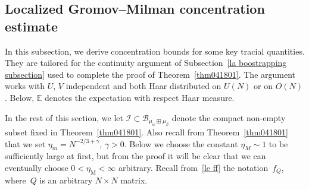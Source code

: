 \documentclass[10pt,reqno]{amsart}
\numberwithin{equation}{section}
\theoremstyle{plain}
\numberwithin{kevin}{section}
\theoremstyle{remark}
\begin{document}
\subsection{Localized Gromov--Milman concentration estimate}\label{la concentration for the random part}
 In this subsection, we derive concentration bounds for some key tracial quantities. They are tailored for the continuity argument of Subsection~\ref{la boostrapping subsection} used to complete the proof of Theorem~\ref{thm041801}. The argument works with $U$, $V$ independent and both Haar distributed on $U(N)$ or on $O(N)$. Below, $\mathbb{E}$ denotes the expectation with respect Haar measure.

 In the rest of this section, we let $\mathcal{I}\subset\mathcal{B}_{\mu_\alpha\boxplus\mu_\beta}$ denote the compact non-empty subset fixed in Theorem~\ref{thm041801}. Also recall from Theorem~\ref{thm041801} that we set $\eta_m=N^{-2/3+\gamma}$, $\gamma>0$. Below we choose the constant $\eta_M\sim 1$ to be sufficiently large at first, but from the proof it will be clear that we can eventually choose $0<\eta_{\mathrm{M}}<\infty$ arbitrary. Recall from~\eqref{le ff} the notation~$f_Q$, where~$Q$ is an arbitrary $N\times N$ matrix.
 
\end{document}

